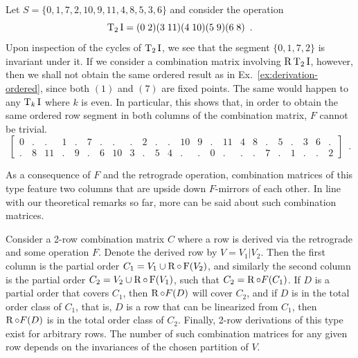 \begin{example}
    \cite[212]{Starr1984}
    Let $S = \{ 0, 1, 7, 2, 10, 9, 11, 4, 8, 5, 3, 6 \}$ and consider the operation
    \begin{equation}
        \operatorname{T}_2\operatorname{I} = (0 \; 2) (3 \; 11) (4 \; 10) (5 \; 9) (6 \; 8) \enspace.
    \end{equation}
    Upon inspection of the cycles of $\operatorname{T}_2\operatorname{I}$, we see that the segment $\{ 0, 1, 7, 2 \}$ is invariant under it. If we consider a combination matrix involving $\operatorname{R}\operatorname{T}_2\operatorname{I}$, however, then we shall not obtain the same ordered result as in Ex.~\ref{ex:derivation-ordered}, since both $(1)$ and $(7)$ are fixed points. The same would happen to any $\operatorname{T}_k\operatorname{I}$ where $k$ is even. In particular, this shows that, in order to obtain the same ordered row segment in both columns of the combination matrix, $F$ cannot be trivial.
	\begin{equation}
    	\left[
    	\begin{array}{cccccccccccc|cccccccccccc}
        	0 & . & . & 1 & . & 7 & . & . & . & 2 & . & . & 10 & 9 & . & 11 & 4 & 8 & . & 5 & . & 3 & 6 & . \\
        	. & 8 & 11 & . & 9 & . & 6 & 10 & 3 & . & 5 & 4 & . & . & 0 & . & . & . & 7 & . & 1 & . & . & 2
    	\end{array}
    	\right] \enspace.
	\end{equation}
\end{example}

As a consequence of $F$ and the retrograde operation, combination matrices of this type feature two columns that are upside down $F$-mirrors of each other. In line with our theoretical remarks so far, more can be said about such combination matrices.

\begin{proposition}
    \cite[211, 214]{Starr1984}
    Consider a 2-row combination matrix $C$ where a row is derived via the retrograde and some operation $F$. Denote the derived row by $V = V_1 | V_2$. Then the first column is the partial order $C_1 = V_1 \cup \operatorname{R} \circ \operatorname{F}(V_2)$, and similarly the second column is the partial order $C_2 = V_2 \cup \operatorname{R} \circ \operatorname{F}(V_1)$, such that $C_2 = \operatorname{R} \circ F(C_1)$. If $D$ is a partial order that covers $C_1$, then $\operatorname{R} \circ F(D)$ will cover $C_2$, and if $D$ is in the total order class of $C_1$, that is, $D$ is a row that can be linearized from $C_1$, then $\operatorname{R} \circ F(D)$ is in the total order class of $C_2$. Finally, 2-row derivations of this type exist for arbitrary rows. The number of such combination matrices for any given row depends on the invariances of the chosen partition of $V$. 
\end{proposition}

